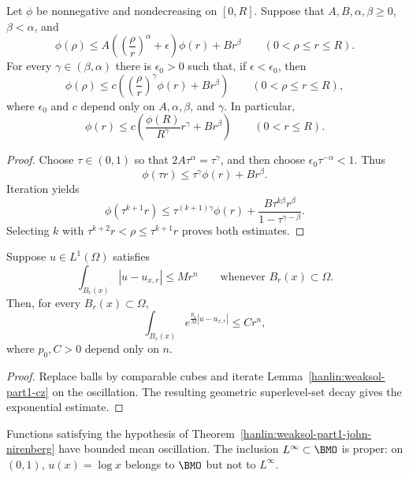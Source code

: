 \begin{lemma}\label{hanlin:weaksol-part1-lemma-3-4}
Let $\phi$ be nonnegative and nondecreasing on $[0,R]$. Suppose that
$A,B,\alpha,\beta\geq0$, $\beta<\alpha$, and
\[
\phi(\rho)\leq A\left(\left(\frac{\rho}{r}\right)^\alpha
+\epsilon\right)\phi(r)+Br^\beta
\qquad(0<\rho\leq r\leq R).
\]
For every $\gamma\in(\beta,\alpha)$ there is $\epsilon_0>0$ such that,
if $\epsilon<\epsilon_0$, then
\[
\phi(\rho)\leq c\left(
\left(\frac{\rho}{r}\right)^\gamma\phi(r)+Br^\beta\right)
\qquad(0<\rho\leq r\leq R),
\]
where $\epsilon_0$ and $c$ depend only on $A,\alpha,\beta$, and $\gamma$.
In particular,
\[
\phi(r)\leq c\left(\frac{\phi(R)}{R^\gamma}r^\gamma+Br^\beta\right)
\qquad(0<r\leq R).
\]
\end{lemma}
\begin{proof}
\sketch Choose $\tau\in(0,1)$ so that
$2A\tau^\alpha=\tau^\gamma$, and then choose
$\epsilon_0\tau^{-\alpha}<1$. Thus
\[
\phi(\tau r)\leq\tau^\gamma\phi(r)+Br^\beta.
\]
Iteration yields
\[
\phi(\tau^{k+1}r)
\leq\tau^{(k+1)\gamma}\phi(r)
+\frac{B\tau^{k\beta}r^\beta}{1-\tau^{\gamma-\beta}}.
\]
Selecting $k$ with $\tau^{k+2}r<\rho\leq\tau^{k+1}r$ proves both
estimates.
\end{proof}

\begin{theorem}\label{hanlin:weaksol-part1-john-nirenberg}
Suppose $u\in L^1(\Omega)$ satisfies
\[
\int_{B_r(x)}|u-u_{x,r}|\leq Mr^n
\qquad\text{whenever }B_r(x)\subset\Omega.
\]
Then, for every $B_r(x)\subset\Omega$,
\[
\int_{B_r(x)}e^{\frac{p_0}{M}|u-u_{x,r}|}\leq Cr^n,
\]
where $p_0,C>0$ depend only on $n$.
\end{theorem}

\begin{proof}
\sketch Replace balls by comparable cubes and iterate
Lemma~\ref{hanlin:weaksol-part1-cz} on the oscillation. The resulting
geometric superlevel-set decay gives the exponential estimate.
\end{proof}

\begin{remark}\label{hanlin:weaksol-part1-bmo}
Functions satisfying the hypothesis of
Theorem~\ref{hanlin:weaksol-part1-john-nirenberg} have bounded mean
oscillation. The inclusion $L^\infty\subset\BMO$ is proper: on $(0,1)$,
$u(x)=\log x$ belongs to $\BMO$ but not to $L^\infty$.
\end{remark}

